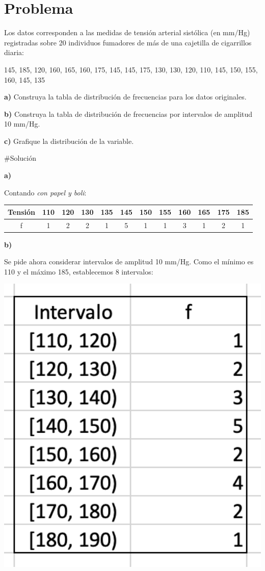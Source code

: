 \documentclass[
]{book}
\begin{document}
\hypertarget{problema-4}{%
\section{Problema}\label{problema-4}}

Los datos corresponden a las medidas de tensión arterial sistólica (en mm/Hg) registradas sobre 20 individuos fumadores de más de una cajetilla de cigarrillos diaria:

145, 185, 120, 160, 165, 160, 175, 145, 145, 175, 130, 130, 120, 110, 145, 150, 155, 160, 145, 135

\textbf{a)} Construya la tabla de distribución de frecuencias para los datos originales.

\textbf{b)} Construya la tabla de distribución de frecuencias por intervalos de amplitud 10 mm/Hg.

\textbf{c)} Grafique la distribución de la variable.

\#Solución

\textbf{a)}

Contando \emph{con papel y boli}:

\begin{longtable}[]{@{}cccccccccccc@{}}
\toprule
Tensión & 110 & 120 & 130 & 135 & 145 & 150 & 155 & 160 & 165 & 175 & 185\tabularnewline
\midrule
\endhead
f & 1 & 2 & 2 & 1 & 5 & 1 & 1 & 3 & 1 & 2 & 1\tabularnewline
\bottomrule
\end{longtable}

\textbf{b)}

Se pide ahora considerar intervalos de amplitud 10 mm/Hg. Como el mínimo es 110 y el máximo 185, establecemos 8 intervalos:

\includegraphics[width=5.28in]{img/1_6}
\end{document}
